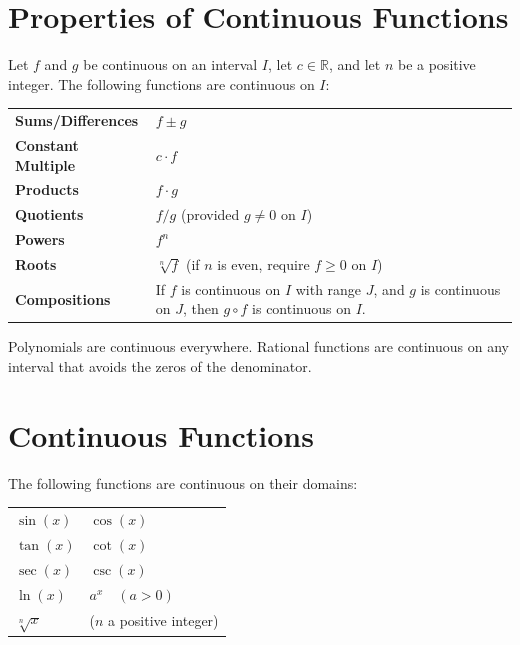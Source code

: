 \section*{Properties of Continuous Functions}

\begin{tcolorbox}[colback=thmbox, colframe=thmborder, arc=2pt,
  left=6pt, right=6pt, top=4pt, bottom=4pt,
  title={\small\textbf{Theorem (Properties of Continuous Functions)}},
  fonttitle=\small\bfseries]
Let $f$ and $g$ be continuous on an interval $I$, let $c \in \mathbb{R}$,
and let $n$ be a positive integer.
The following functions are continuous on $I$:

\medskip
\begin{tabular}{@{}p{}p{}@{}}
\textbf{Sums/Differences}  & $f \pm g$ \\[6pt]
\textbf{Constant Multiple} & $c \cdot f$ \\[6pt]
\textbf{Products}          & $f \cdot g$ \\[6pt]
\textbf{Quotients}         & $f/g$ \quad (provided $g \neq 0$ on $I$) \\[6pt]
\textbf{Powers}            & $f^n$ \\[6pt]
\textbf{Roots}             & $\sqrt[n]{f}$ \quad (if $n$ is even, require $f \geq 0$ on $I$) \\[6pt]
\textbf{Compositions}      & If $f$ is continuous on $I$ with range $J$, and $g$ is
                             continuous on $J$, then $g \circ f$ is continuous on $I$.
\end{tabular}
\end{tcolorbox}

\begin{remark*}
Polynomials are continuous everywhere.
Rational functions are continuous on any interval that avoids the
zeros of the denominator.
\end{remark*}

\section*{Continuous Functions}

\begin{tcolorbox}[colback=thmbox, colframe=thmborder, arc=2pt,
  left=6pt, right=6pt, top=4pt, bottom=4pt,
  title={\small\textbf{Theorem (Continuous Functions)}},
  fonttitle=\small\bfseries]
The following functions are continuous on their domains:

\medskip
\begin{tabular}{@{}p{}p{}@{}}
$\sin(x)$     & $\cos(x)$           \\[4pt]
$\tan(x)$     & $\cot(x)$           \\[4pt]
$\sec(x)$     & $\csc(x)$           \\[4pt]
$\ln(x)$      & $a^x \quad (a > 0)$ \\[4pt]
$\sqrt[n]{x}$ & ($n$ a positive integer) \\
\end{tabular}
\end{tcolorbox}

